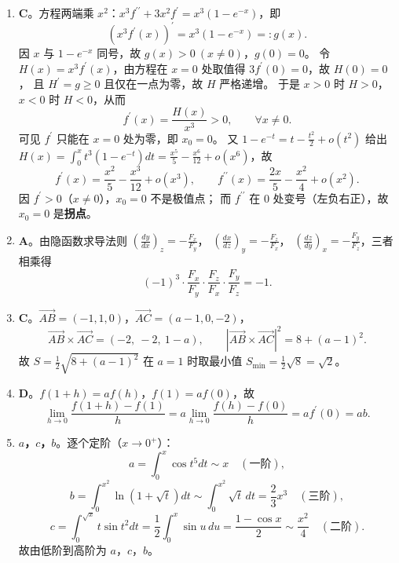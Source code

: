 \begin{enumerate}
{\begin{enumerate}
	\item
	\textbf{C}。方程两端乘 $x^2$：$x^3 f^{\prime \prime}+3 x^2 f^{\prime}=x^3\left(1-e^{-x}\right)$，即
	\[
	\left(x^3 f^{\prime}(x)\right)^{\prime}=x^3\left(1-e^{-x}\right)=: g(x).
	\]
	因 $x$ 与 $1-e^{-x}$ 同号，故 $g(x)>0\ (x \neq 0)$，$g(0)=0$。
	令 $H(x)=x^3 f^{\prime}(x)$，由方程在 $x=0$ 处取值得 $3 f^{\prime}(0)=0$，故 $H(0)=0$，
	且 $H^{\prime}=g \geqslant 0$ 且仅在一点为零，故 $H$ 严格递增。
	于是 $x>0$ 时 $H>0$，$x<0$ 时 $H<0$，从而
	\[
	f^{\prime}(x)=\frac{H(x)}{x^3}>0,\qquad \forall x \neq 0 .
	\]
	可见 $f^{\prime}$ 只能在 $x=0$ 处为零，即 $x_0=0$。
	又 $1-e^{-t}=t-\frac{t^2}{2}+o\left(t^2\right)$ 给出
	$H(x)=\int_0^x t^3\left(1-e^{-t}\right) d t=\frac{x^5}{5}-\frac{x^6}{12}+o\left(x^6\right)$，故
	\[
	f^{\prime}(x)=\frac{x^2}{5}-\frac{x^3}{12}+o\left(x^3\right),\qquad
	f^{\prime \prime}(x)=\frac{2 x}{5}-\frac{x^2}{4}+o\left(x^2\right).
	\]
	因 $f^{\prime}>0$（$x \neq 0$），$x_0=0$ 不是极值点；
	而 $f^{\prime \prime}$ 在 $0$ 处变号（左负右正），故 $x_0=0$ 是\textbf{拐点}。

	\item
	\textbf{A}。由隐函数求导法则
	$\left(\frac{d y}{d x}\right)_z=-\frac{F_x}{F_y}$，
	$\left(\frac{d x}{d z}\right)_y=-\frac{F_z}{F_x}$，
	$\left(\frac{d z}{d y}\right)_x=-\frac{F_y}{F_z}$，三者相乘得
	\[
	(-1)^3 \cdot \frac{F_x}{F_y} \cdot \frac{F_z}{F_x} \cdot \frac{F_y}{F_z}=-1 .
	\]

	\item
	\textbf{C}。$\overrightarrow{A B}=(-1,1,0)$，$\overrightarrow{A C}=(a-1,0,-2)$，
	\[
	\overrightarrow{A B} \times \overrightarrow{A C}=(-2,\ -2,\ 1-a),\qquad
	\left|\overrightarrow{A B} \times \overrightarrow{A C}\right|^2=8+(a-1)^2 .
	\]
	故 $S=\frac{1}{2} \sqrt{8+(a-1)^2}$ 在 $a=1$ 时取最小值
	$S_{\min }=\frac{1}{2} \sqrt{8}=\sqrt{2}$。

	\item
	\textbf{D}。$f(1+h)=a f(h)$，$f(1)=a f(0)$，故
	\[
	\lim _{h \rightarrow 0} \frac{f(1+h)-f(1)}{h}=a \lim _{h \rightarrow 0} \frac{f(h)-f(0)}{h}=a f^{\prime}(0)=a b .
	\]

	\item
	\textbf{$a$，$c$，$b$}。逐个定阶（$x \rightarrow 0^{+}$）：
	\[
	a=\int_0^x \cos t^5 d t \sim x \quad(\text{一阶}),
	\]
	\[
	b=\int_0^{x^2} \ln (1+\sqrt{t}) d t \sim \int_0^{x^2} \sqrt{t}\, d t=\frac{2}{3} x^3 \quad(\text{三阶}),
	\]
	\[
	c=\int_0^{\sqrt{x}} t \sin t^2 d t=\frac{1}{2} \int_0^x \sin u\, d u=\frac{1-\cos x}{2} \sim \frac{x^2}{4} \quad(\text{二阶}).
	\]
	故由低阶到高阶为 $a$，$c$，$b$。


\end{enumerate}}
\end{enumerate}
